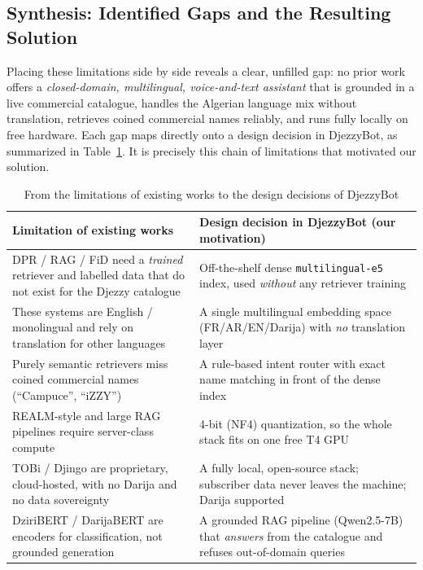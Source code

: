 \documentclass[12pt, a4paper]{report}
\newcommand{\humantext}[1]{#1}      %
\begin{document}
\subsection{Synthesis: Identified Gaps and the Resulting Solution}
\humantext{Placing these limitations side by side reveals a clear, unfilled gap: no prior work offers a \emph{closed-domain, multilingual, voice-and-text assistant} that is grounded in a live commercial catalogue, handles the Algerian language mix without translation, retrieves coined commercial names reliably, and runs fully locally on free hardware. Each gap maps directly onto a design decision in DjezzyBot, as summarized in Table~\ref{tab:related_work}. It is precisely this chain of limitations that motivated our solution.}

\begin{table}[H]
\centering
\caption{From the limitations of existing works to the design decisions of DjezzyBot}
\label{tab:related_work}
\begin{tabularx}{\textwidth}{X X}
\toprule
\textbf{Limitation of existing works} & \textbf{Design decision in DjezzyBot (our motivation)} \\
\midrule
DPR / RAG / FiD need a \emph{trained} retriever and labelled data that do not exist for the Djezzy catalogue & Off-the-shelf dense \texttt{multilingual-e5} index, used \emph{without} any retriever training \\
These systems are English / monolingual and rely on translation for other languages & A single multilingual embedding space (FR/AR/EN/Darija) with \emph{no} translation layer \\
Purely semantic retrievers miss coined commercial names (``Campuce'', ``iZZY'') & A rule-based intent router with exact name matching in front of the dense index \\
REALM-style and large RAG pipelines require server-class compute & 4-bit (NF4) quantization, so the whole stack fits on one free T4 GPU \\
TOBi / Djingo are proprietary, cloud-hosted, with no Darija and no data sovereignty & A fully local, open-source stack; subscriber data never leaves the machine; Darija supported \\
DziriBERT / DarijaBERT are encoders for classification, not grounded generation & A grounded RAG pipeline (Qwen2.5-7B) that \emph{answers} from the catalogue and refuses out-of-domain queries \\
\bottomrule
\end{tabularx}
\end{table}
\end{document}
